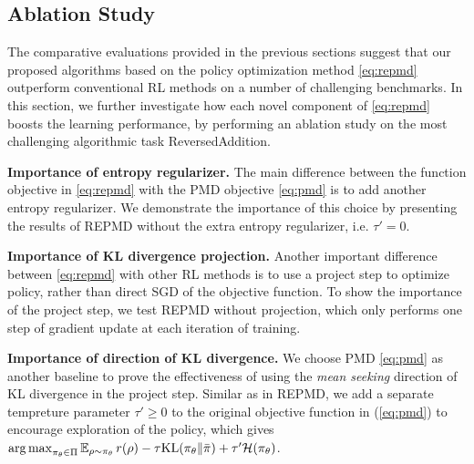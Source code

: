 
\subsection{Ablation Study}
\label{subsec:ablationstudy}

The comparative evaluations provided in the previous sections suggest that our proposed algorithms based on the policy optimization method \ref{eq:repmd} outperform conventional RL methods on a number of challenging benchmarks. In this section, we further investigate how each novel component of \cref{eq:repmd} boosts the learning performance, by performing an ablation study on the most challenging algorithmic task ReversedAddition. 


\textbf{Importance of entropy regularizer.} The main difference between the function objective in \cref{eq:repmd} with the PMD objective \cref{eq:pmd} is to add another entropy regularizer. We demonstrate the importance of this choice by presenting the results of REPMD without the extra entropy regularizer, i.e. $\tau'=0$.

\textbf{Importance of KL divergence projection.} Another important difference between \cref{eq:repmd} with other RL methods is to use a project step to optimize policy, rather than direct SGD of the objective function. To show the importance of the project step, we test REPMD without projection, which only performs one step of gradient update at each iteration of training. 

\textbf{Importance of direction of KL divergence.} We choose PMD \ref{eq:pmd} as another baseline to prove the effectiveness of using the \emph{mean seeking} direction of KL divergence in the project step. Similar as in REPMD, we add a separate tempreture parameter $\tau'\geq 0$ to the original objective function in (\ref{eq:pmd}) to encourage exploration of the policy, which gives $\operatorname*{arg\,max}_{\pi_\theta \in \Pi}{ \operatorname*{\mathbb{E}}_{\rho \sim \pi_\theta}{  r(\rho)  - \tau \text{KL}(\pi_\theta \| \bar{\pi}) } + \tau'\mathcal{H}(\pi_\theta) }$.

